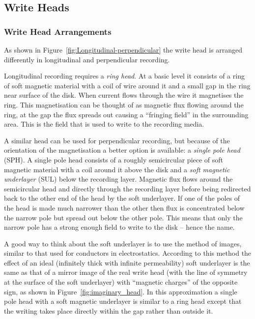 \subsection{Write Heads}

\subsubsection{Write Head Arrangements}

As shown in Figure~\ref{fig:Longitudinal-perpendicular} the write head is
arranged differently in longitudinal and perpendicular recording.

Longitudinal recording requires a \emph{ring head}. At a basic level it consists
of a ring of soft magnetic material with a coil of wire around it and a small
gap in the ring near surface of the disk. When current flows through the wire it
magnetises the ring. This magnetisation can be thought of as magnetic flux
flowing around the ring, at the gap the flux spreads out causing a ``fringing
field'' in the surrounding area. This is the field that is used to write to the
recording media.\cite{Khizroev2004a}

A similar head can be used for perpendicular recording, but because of the
orientation of the magnetisation a better option is available: a \emph{single
  pole head }(SPH). A single pole head consists of a roughly semicircular piece
of soft magnetic material with a coil around it above the disk and a \emph{soft
  magnetic underlayer} (SUL) below the recording layer.  Magnetic flux flows
around the semicircular head and directly through the recording layer before
being redirected back to the other end of the head by the soft underlayer. If
one of the poles of the head is made much narrower than the other then flux is
concentrated below the narrow pole but spread out below the other pole. This
means that only the narrow pole has a strong enough field to write to the disk
-- hence the name.\cite{Khizroev2004a}

A good way to think about the soft underlayer is to use the method of images,
similar to that used for conductors in electrostatics. \cite{Hoinville2002}
According to this method the effect of an ideal (infinitely thick with infinite
permeability) soft underlayer is the same as that of a mirror image of the real
write head (with the line of symmetry at the surface of the soft underlayer)
with ``magnetic charges'' of the opposite sign, as shown in
Figure~\ref{fig:imaginary_head}. In this approximation a single pole head with a
soft magnetic underlayer is similar to a ring head except that the writing takes
place directly within the gap rather than outside it.\cite{Richter2007a}

